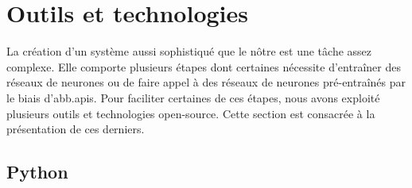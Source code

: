 \section{Outils et technologies}
\label{sec.tech}

La création d'un système aussi sophistiqué que le nôtre est une tâche assez complexe.
Elle comporte plusieurs étapes dont certaines nécessite d'entraîner des réseaux de neurones 
ou de faire appel à des réseaux de neurones pré-entraînés par le biais d'\glspl{abb.api}.
Pour faciliter certaines de ces étapes, nous avons exploité plusieurs outils et technologies open-source.
Cette section est consacrée à la présentation de ces derniers.

\subsection{Python}
\label{subsec.python}
